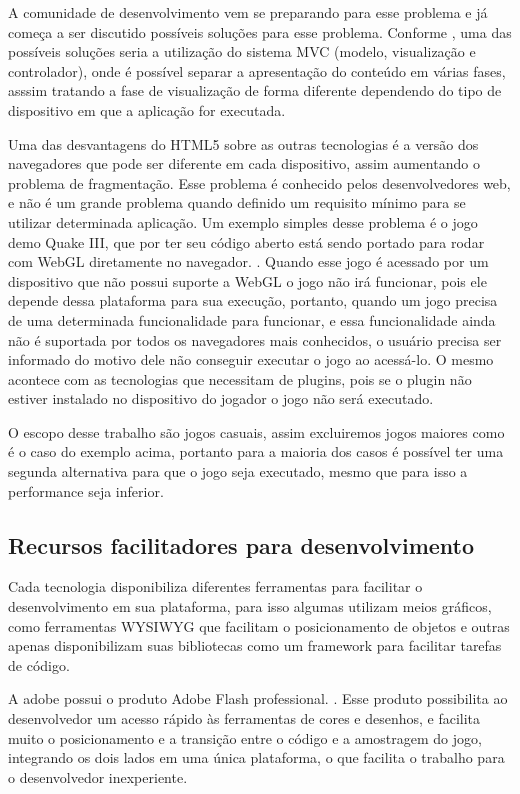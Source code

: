 A comunidade de desenvolvimento vem se preparando para esse problema e
já começa a ser discutido possíveis soluções para esse problema.
Conforme , uma das possíveis soluções seria a
utilização do sistema MVC (modelo, visualização e controlador), onde é
possível separar a apresentação do conteúdo em várias fases, asssim
tratando a fase de visualização de forma diferente dependendo do tipo
de dispositivo em que a aplicação for executada.

Uma das desvantagens do HTML5 sobre as outras tecnologias é a versão
dos navegadores que pode ser diferente em cada dispositivo, assim
aumentando o problema de fragmentação. Esse problema é conhecido pelos
desenvolvedores web, e não é um grande problema quando definido um
requisito mínimo para se utilizar determinada aplicação. Um exemplo
simples desse problema é o jogo demo Quake III, que por ter seu código
aberto está sendo portado para rodar com WebGL diretamente no navegador.
\cite{website:webglquake3}. Quando esse jogo é acessado por um
dispositivo que não possui suporte a WebGL o jogo não irá funcionar,
pois ele depende dessa plataforma para sua execução, portanto, quando
um jogo precisa de uma determinada funcionalidade para funcionar, e
essa funcionalidade ainda não é suportada por todos os navegadores
mais conhecidos, o usuário precisa ser informado do motivo dele não
conseguir executar o jogo ao acessá-lo. O mesmo acontece com as
tecnologias que necessitam de plugins, pois se o plugin não estiver
instalado no dispositivo do jogador o jogo não será executado.

O escopo desse trabalho são jogos casuais, assim excluiremos jogos
maiores como é o caso do exemplo acima, portanto para a maioria dos
casos é possível ter uma segunda alternativa para que o jogo seja
executado, mesmo que para isso a performance seja inferior.

\subsection{Recursos facilitadores para desenvolvimento}

Cada tecnologia disponibiliza diferentes ferramentas para facilitar o
desenvolvimento em sua plataforma, para isso algumas utilizam meios
gráficos, como ferramentas WYSIWYG que facilitam o posicionamento de
objetos e outras apenas disponibilizam suas bibliotecas como um
framework para facilitar tarefas de código.

A adobe possui o produto Adobe Flash professional. \cite{website:adobeflash}.
Esse produto possibilita ao desenvolvedor um acesso rápido às ferramentas de cores
e desenhos, e facilita muito o posicionamento e a transição entre o
código e a amostragem do jogo, integrando os dois lados em uma única
plataforma, o que facilita o trabalho para o desenvolvedor
inexperiente.

